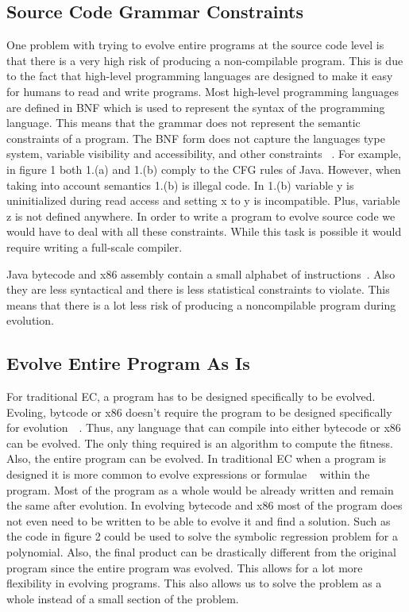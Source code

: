 \documentclass{sig-alternate}
\begin{document}
\subsection{Source Code Grammar Constraints}
One problem with trying to evolve entire programs at the source code level is that there is a very high risk of producing a non-compilable program. This is due to the fact that high-level programming languages are designed to make it easy for humans to read and write programs. Most high-level programming languages are defined in BNF which is used to represent the syntax of the programming language. This means that the grammar does not represent the semantic constraints of a program. The BNF form does not capture the languages type system, variable visibility and accessibility, and other constraints ~\cite{FINCH:2011}. For example, in figure 1 both 1.(a) and 1.(b) comply to the CFG rules of Java. However, when taking into account semantics 1.(b) is illegal code. In 1.(b) variable y is uninitialized during read access and setting x to y is incompatible. Plus, variable z is not defined anywhere.  In order to write a program to evolve source code we would have to deal with all these constraints. While this task is possible it would require writing a full-scale compiler. \par

Java bytecode and x86 assembly contain a small alphabet of instructions~\cite{Assembly:2010}. Also they are less syntactical and there is less statistical constraints to violate. This means that there is a lot less risk of producing a noncompilable program during evolution. 

\subsection{Evolve Entire Program As Is}
For traditional EC, a program has to be designed specifically to be evolved. Evoling, bytcode or x86 doesn't require the program to be designed specifically for evolution~\cite{Assembly:2010}~\cite{FINCH:2011}. Thus, any language that can compile into either bytecode or x86 can be evolved. The only thing required is an algorithm to compute the fitness. Also, the entire program can be evolved. In traditional EC when a program is designed it is more common to evolve expressions or formulae ~\cite{FINCH:2011} within the program. Most of the program as a whole would be already written and remain the same after evolution. In evolving bytecode and x86 most of the program does not even need to be written to be able to evolve it and find a solution. Such as the code in figure 2 could be used to solve the symbolic regression problem for a polynomial. Also, the final product can be drastically different from the original program since the entire program was evolved. This allows for a lot more flexibility in evolving programs. This also allows us to solve the problem as a whole instead of a small section of the problem.
\end{document}
